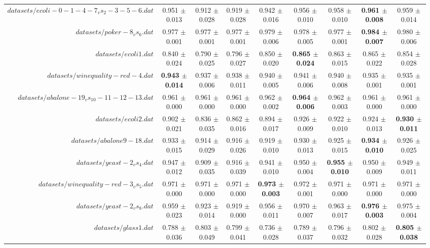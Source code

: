 \begin{table}[!ht]
{\begin{tabular}{r c c c c c c c c}
$datasets/ecoli-0-1-4-7_vs_2-3-5-6.dat$ & 0.951 $\pm$ 0.013 & 0.912 $\pm$ 0.028 & 0.919 $\pm$ 0.028 & 0.942 $\pm$ 0.016 & 0.956 $\pm$ 0.010 & 0.958 $\pm$ 0.010 & \textbf{0.961 $\pm$ 0.008} & 0.959 $\pm$ 0.014 \\
$datasets/poker-8_vs_6.dat$ & 0.977 $\pm$ 0.001 & 0.977 $\pm$ 0.001 & 0.977 $\pm$ 0.001 & 0.979 $\pm$ 0.006 & 0.978 $\pm$ 0.005 & 0.977 $\pm$ 0.001 & \textbf{0.984 $\pm$ 0.007} & 0.980 $\pm$ 0.006 \\
$datasets/ecoli1.dat$ & 0.840 $\pm$ 0.024 & 0.790 $\pm$ 0.025 & 0.796 $\pm$ 0.027 & 0.850 $\pm$ 0.020 & \textbf{0.865 $\pm$ 0.024} & 0.863 $\pm$ 0.015 & 0.865 $\pm$ 0.022 & 0.854 $\pm$ 0.028 \\
$datasets/winequality-red-4.dat$ & \textbf{0.943 $\pm$ 0.014} & 0.937 $\pm$ 0.006 & 0.938 $\pm$ 0.011 & 0.940 $\pm$ 0.005 & 0.941 $\pm$ 0.006 & 0.940 $\pm$ 0.008 & 0.935 $\pm$ 0.001 & 0.935 $\pm$ 0.001 \\
$datasets/abalone-19_vs_10-11-12-13.dat$ & 0.961 $\pm$ 0.000 & 0.961 $\pm$ 0.000 & 0.961 $\pm$ 0.000 & 0.962 $\pm$ 0.002 & \textbf{0.964 $\pm$ 0.006} & 0.962 $\pm$ 0.003 & 0.961 $\pm$ 0.000 & 0.961 $\pm$ 0.000 \\
$datasets/ecoli2.dat$ & 0.902 $\pm$ 0.021 & 0.836 $\pm$ 0.035 & 0.862 $\pm$ 0.016 & 0.894 $\pm$ 0.017 & 0.926 $\pm$ 0.009 & 0.922 $\pm$ 0.010 & 0.924 $\pm$ 0.013 & \textbf{0.930 $\pm$ 0.011} \\
$datasets/abalone9-18.dat$ & 0.933 $\pm$ 0.015 & 0.914 $\pm$ 0.029 & 0.916 $\pm$ 0.026 & 0.919 $\pm$ 0.010 & 0.930 $\pm$ 0.013 & 0.925 $\pm$ 0.015 & \textbf{0.934 $\pm$ 0.010} & 0.926 $\pm$ 0.025 \\
$datasets/yeast-2_vs_4.dat$ & 0.947 $\pm$ 0.012 & 0.909 $\pm$ 0.035 & 0.916 $\pm$ 0.039 & 0.941 $\pm$ 0.010 & 0.950 $\pm$ 0.004 & \textbf{0.955 $\pm$ 0.010} & 0.950 $\pm$ 0.009 & 0.949 $\pm$ 0.011 \\
$datasets/winequality-red-3_vs_5.dat$ & 0.971 $\pm$ 0.000 & 0.971 $\pm$ 0.000 & 0.971 $\pm$ 0.000 & \textbf{0.973 $\pm$ 0.003} & 0.972 $\pm$ 0.001 & 0.971 $\pm$ 0.000 & 0.971 $\pm$ 0.000 & 0.971 $\pm$ 0.000 \\
$datasets/yeast-2_vs_8.dat$ & 0.959 $\pm$ 0.023 & 0.923 $\pm$ 0.014 & 0.919 $\pm$ 0.000 & 0.956 $\pm$ 0.011 & 0.970 $\pm$ 0.007 & 0.963 $\pm$ 0.017 & \textbf{0.976 $\pm$ 0.003} & 0.975 $\pm$ 0.004 \\
$datasets/glass1.dat$ & 0.788 $\pm$ 0.036 & 0.803 $\pm$ 0.049 & 0.799 $\pm$ 0.041 & 0.736 $\pm$ 0.028 & 0.789 $\pm$ 0.037 & 0.796 $\pm$ 0.032 & 0.802 $\pm$ 0.028 & \textbf{0.805 $\pm$ 0.038} \\

\end{tabular}}
\end{table}
